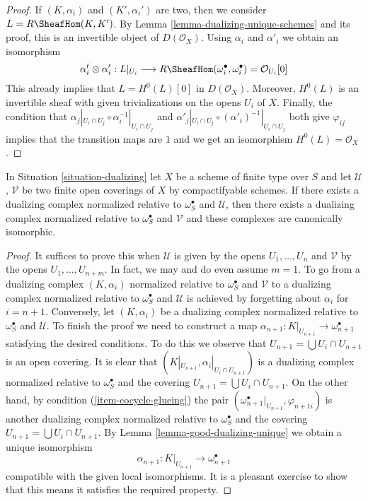 \begin{proof}
If $(K, \alpha_i)$ and $(K', \alpha_i')$ are two, then we consider
$L = R\SheafHom(K, K')$. By Lemma \ref{lemma-dualizing-unique-schemes}
and its proof, this is an invertible object of $D(\mathcal{O}_X)$.
Using $\alpha_i$ and $\alpha'_i$ we obtain an isomorphism
$$
\alpha_i^t \otimes \alpha'_i :
L|_{U_i} \longrightarrow
R\SheafHom(\omega_i^\bullet, \omega_i^\bullet) = \mathcal{O}_{U_i}[0]
$$
This already implies that $L = H^0(L)[0]$ in $D(\mathcal{O}_X)$.
Moreover, $H^0(L)$ is an invertible sheaf with given trivializations
on the opens $U_i$ of $X$. Finally, the condition that
$\alpha_j|_{U_i \cap U_j} \circ \alpha_i^{-1}|_{U_i \cap U_j}$
and
$\alpha'_j|_{U_i \cap U_j} \circ (\alpha'_i)^{-1}|_{U_i \cap U_j}$
both give $\varphi_{ij}$ implies that the transition maps
are $1$ and we get an isomorphism $H^0(L) = \mathcal{O}_X$.
\end{proof}

\begin{lemma}
\label{lemma-good-dualizing-independence-covering}
In Situation \ref{situation-dualizing} let $X$ be a scheme of finite type
over $S$ and let $\mathcal{U}$, $\mathcal{V}$ be two finite open coverings
of $X$ by compactifyable schemes.
If there exists a dualizing complex normalized
relative to $\omega_S^\bullet$ and $\mathcal{U}$, then
there exists a dualizing complex normalized relative to
$\omega_S^\bullet$ and $\mathcal{V}$ and these complexes are
canonically isomorphic.
\end{lemma}

\begin{proof}
It suffices to prove this when $\mathcal{U}$ is given by the opens
$U_1, \ldots, U_n$ and $\mathcal{V}$ by the opens $U_1, \ldots, U_{n + m}$.
In fact, we may and do even assume $m = 1$.
To go from a dualizing complex $(K, \alpha_i)$ normalized
relative to $\omega_S^\bullet$ and $\mathcal{V}$ to a
dualizing complex normalized relative to $\omega_S^\bullet$ and $\mathcal{U}$
is achieved by forgetting about $\alpha_i$ for $i = n + 1$. Conversely, let
$(K, \alpha_i)$ be a dualizing complex normalized relative to
$\omega_S^\bullet$ and $\mathcal{U}$.
To finish the proof we need to construct a map
$\alpha_{n + 1} : K|_{U_{n + 1}} \to \omega_{n + 1}^\bullet$ satisfying
the desired conditions.
To do this we observe that $U_{n + 1} = \bigcup U_i \cap U_{n + 1}$
is an open covering.
It is clear that $(K|_{U_{n + 1}}, \alpha_i|_{U_i \cap U_{n + 1}})$
is a dualizing complex normalized relative to $\omega_S^\bullet$
and the covering $U_{n + 1} = \bigcup U_i \cap U_{n + 1}$.
On the other hand, by condition (\ref{item-cocycle-glueing}) the pair
$(\omega_{n + 1}^\bullet|_{U_{n + 1}}, \varphi_{n + 1i})$
is another dualizing complex normalized relative to $\omega_S^\bullet$
and the covering
$U_{n + 1} = \bigcup U_i \cap U_{n + 1}$.
By Lemma \ref{lemma-good-dualizing-unique} we obtain a unique isomorphism
$$
\alpha_{n + 1} : K|_{U_{n + 1}} \longrightarrow \omega_{n + 1}^\bullet
$$
compatible with the given local isomorphisms.
It is a pleasant exercise to show that this means it satisfies
the required property.
\end{proof}


